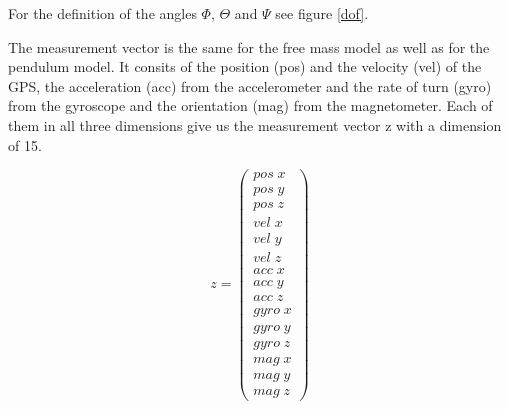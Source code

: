 For the definition of the angles $\Phi$, $\Theta$ and $\Psi$ see figure \ref{dof}.

 The measurement vector is the same for the free mass model as well as for the pendulum model. It consits of the position (pos) and the velocity (vel) of the GPS, the acceleration (acc) from the accelerometer and the rate of turn (gyro) from the gyroscope and the orientation (mag) from the magnetometer. Each of them in all three dimensions give us the measurement vector z with a dimension of 15.
 
\begin{equation}
 z= \begin{pmatrix}
  pos\;x \\
  pos\;y \\
  pos\;z \\
  vel\;x \\
  vel\;y \\
  vel\;z \\
  acc\;x \\
  acc\;y \\
  acc\;z \\
  gyro\;x \\
  gyro\;y \\
  gyro\;z \\
  mag\;x \\
  mag\;y \\
  mag\;z
 \end{pmatrix}
\end{equation}



